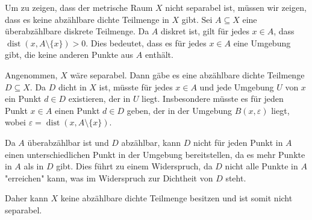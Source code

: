 Um zu zeigen, dass der metrische Raum \(X\) nicht separabel ist, müssen wir zeigen, dass es keine abzählbare dichte Teilmenge in \(X\) gibt. Sei \(A \subseteq X\) eine überabzählbare diskrete Teilmenge. Da \(A\) diskret ist, gilt für jedes \(x \in A\), dass \(\operatorname{dist}(x, A \setminus \{x\}) > 0\). Dies bedeutet, dass es für jedes \(x \in A\) eine Umgebung gibt, die keine anderen Punkte aus \(A\) enthält.

Angenommen, \(X\) wäre separabel. Dann gäbe es eine abzählbare dichte Teilmenge \(D \subseteq X\). Da \(D\) dicht in \(X\) ist, müsste für jedes \(x \in A\) und jede Umgebung \(U\) von \(x\) ein Punkt \(d \in D\) existieren, der in \(U\) liegt. Insbesondere müsste es für jeden Punkt \(x \in A\) einen Punkt \(d \in D\) geben, der in der Umgebung \(B(x, \varepsilon)\) liegt, wobei \(\varepsilon = \operatorname{dist}(x, A \setminus \{x\})\).

Da \(A\) überabzählbar ist und \(D\) abzählbar, kann \(D\) nicht für jeden Punkt in \(A\) einen unterschiedlichen Punkt in der Umgebung bereitstellen, da es mehr Punkte in \(A\) als in \(D\) gibt. Dies führt zu einem Widerspruch, da \(D\) nicht alle Punkte in \(A\) "erreichen" kann, was im Widerspruch zur Dichtheit von \(D\) steht.

Daher kann \(X\) keine abzählbare dichte Teilmenge besitzen und ist somit nicht separabel.